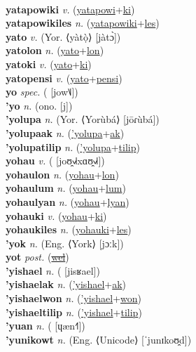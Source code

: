  \label{yatapowinules} \\
\textbf{yatapowiki} \textit{v.} (\hyperref[yatapowi]{yatapowi}+\hyperref[ki]{ki})
 \label{yatapowiki} \\
\textbf{yatapowikiles} \textit{n.} (\hyperref[yatapowiki]{yatapowiki}+\hyperref[les]{les})
 \label{yatapowikiles} \\
\textbf{yato} \textit{v.} (Yor. ⟨yàtọ̀⟩ [jàtɔ̀])
 \label{yato} \\
\textbf{yatolon} \textit{n.} (\hyperref[yato]{yato}+\hyperref[lon]{lon})
 \label{yatolon} \\
\textbf{yatoki} \textit{v.} (\hyperref[yato]{yato}+\hyperref[ki]{ki})
 \label{yatoki} \\
\textbf{yatopensi} \textit{v.} (\hyperref[yato]{yato}+\hyperref[pensi]{pensi})
 \label{yatopensi} \\
\textbf{yo} \textit{spec.} ( [jow˥˩])
 \label{yo} \\
\textbf{'yo} \textit{n.} (ono. [j])
 \label{'yo} \\
\textbf{'yolupa} \textit{n.} (Yor. ⟨Yorùbá⟩ [jōɾùbá])
 \label{'yolupa} \\
\textbf{'yolupaak} \textit{n.} (\hyperref['yolupa]{'yolupa}+\hyperref[ak]{ak})
 \label{'yolupaak} \\
\textbf{'yolupatilip} \textit{n.} (\hyperref['yolupa]{'yolupa}+\hyperref[tilip]{tilip})
 \label{'yolupatilip} \\
\textbf{yohau} \textit{v.} ( [joʊ̯˧˩˧xɑʊ̯˧˩˧])
 \label{yohau} \\
\textbf{yohaulon} \textit{n.} (\hyperref[yohau]{yohau}+\hyperref[lon]{lon})
 \label{yohaulon} \\
\textbf{yohaulum} \textit{n.} (\hyperref[yohau]{yohau}+\hyperref[lum]{lum})
 \label{yohaulum} \\
\textbf{yohaulyan} \textit{n.} (\hyperref[yohau]{yohau}+\hyperref[lyan]{lyan})
 \label{yohaulyan} \\
\textbf{yohauki} \textit{v.} (\hyperref[yohau]{yohau}+\hyperref[ki]{ki})
 \label{yohauki} \\
\textbf{yohaukiles} \textit{n.} (\hyperref[yohauki]{yohauki}+\hyperref[les]{les})
 \label{yohaukiles} \\
\textbf{'yok} \textit{n.} (Eng. ⟨York⟩ [jɔːk])
 \label{'yok} \\
\textbf{yot} \textit{post.} (\hyperref[wel]{\sout{wel}})
 \label{yot} \\
\textbf{'yishael} \textit{n.} ( [jisʁael])
 \label{'yishael} \\
\textbf{'yishaelak} \textit{n.} (\hyperref['yishael]{'yishael}+\hyperref[ak]{ak})
 \label{'yishaelak} \\
\textbf{'yishaelwon} \textit{n.} (\hyperref['yishael]{'yishael}+\hyperref[won]{won})
 \label{'yishaelwon} \\
\textbf{'yishaeltilip} \textit{n.} (\hyperref['yishael]{'yishael}+\hyperref[tilip]{tilip})
 \label{'yishaeltilip} \\
\textbf{'yuan} \textit{n.} ( [ɥæn˧˥])
 \label{'yuan} \\
\textbf{'yunikowt} \textit{n.} (Eng. ⟨Unicode⟩ [ˈjunɪkoʊ̯d])
 \label{'yunikowt} 

